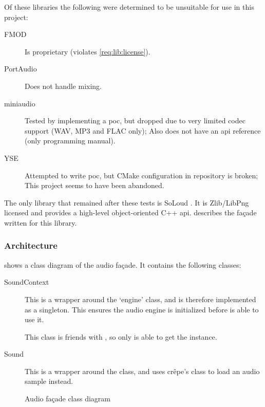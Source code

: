 \documentclass{projdoc}
\begin{document}
Of these libraries the following were determined to be unsuitable for use in this
project:\noparbreak
\begin{description}
	\item[FMOD \autocite{lib:fmod}] Is proprietary (violates \cref{req:lib:license}).
	\item[PortAudio \autocite{lib:portaudio}] Does not handle mixing.
	\item[miniaudio \autocite{lib:miniaudio}] Tested by implementing a \gls{poc}, but
		dropped due to very limited codec support (WAV, MP3 and FLAC only); Also does not
		have an \gls{api} reference (only programming manual).
	\item[YSE \autocite{lib:yse}] Attempted to write \gls{poc}, but CMake configuration
		in repository is broken; This project seems to have been abandoned.
\end{description}

The only library that remained after these tests is SoLoud \autocite{lib:soloud}. It
is Zlib/LibPng licensed and provides a high-level object-oriented C++ \gls{api}.
 describes the fa\c{c}ade written for this library.

\subsubsection{Architecture}
\label{sec:audio:architecture}

 shows a class diagram of the audio fa\c{c}ade. It
contains the following classes:
\begin{description}
	\item[SoundContext] This is a wrapper around the 
		`engine' class, and is therefore implemented as a singleton. This ensures the
		audio engine is initialized before  is able to use it.

		This class is friends with , so only  is able
		to get the  instance.
	\item[Sound] This is a wrapper around the  class, and uses
		cr\^epe's  class to load an audio sample instead.
\end{description}

\begin{figure}
	\centering
	\caption{Audio fa\c{c}ade class diagram}
	\label{fig:class-audio-facade}
\end{figure}
\end{document}

